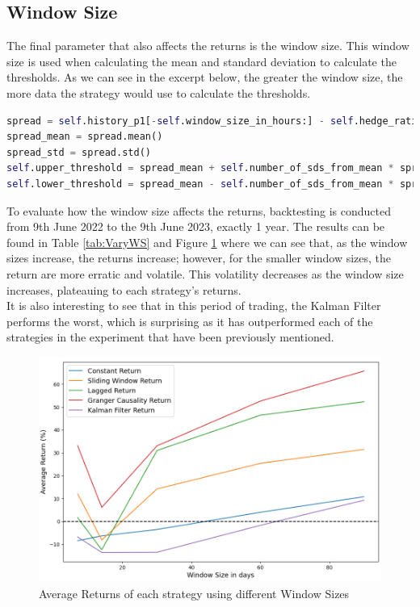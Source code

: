 \subsection{Window Size}
The final parameter that also affects the returns is the window size. This window size is used when calculating the mean and standard deviation to calculate the thresholds. As we can see in the excerpt below, the greater the window size, the more data the strategy would use to calculate the thresholds.
\vspace{5mm}
\begin{lstlisting}[language=Python]
spread = self.history_p1[-self.window_size_in_hours:] - self.hedge_ratio * self.history_p2[-self.window_size_in_hours:]
spread_mean = spread.mean()
spread_std = spread.std()
self.upper_threshold = spread_mean + self.number_of_sds_from_mean * spread_std
self.lower_threshold = spread_mean - self.number_of_sds_from_mean * spread_std
\end{lstlisting}
\vspace{5mm}
To evaluate how the window size affects the returns, backtesting is conducted from 9th June 2022 to the 9th June 2023, exactly 1 year. The results can be found in Table \ref{tab:VaryWS} and Figure \ref{fig:VaryWS} where we can see that, as the window sizes increase, the returns increase; however, for the smaller window sizes, the return are more erratic and volatile. This volatility decreases as the window size increases, plateauing to each strategy's returns.
\\[3mm]
It is also interesting to see that in this period of trading, the Kalman Filter performs the worst, which is surprising as it has outperformed each of the strategies in the experiment that have been previously mentioned.

\begin{figure}[H]
    \centering
    \includegraphics[width=\linewidth]{evaluation/Images/VarWS.png}
    \caption{Average Returns of each strategy using different Window Sizes}
    \label{fig:VaryWS}
\end{figure}


